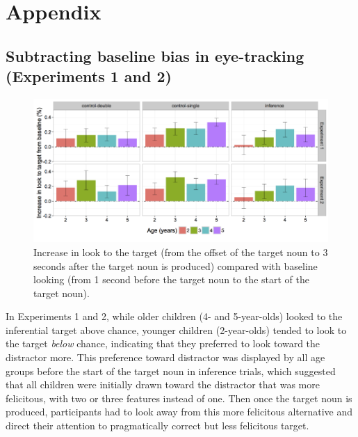 \documentclass[a4paper,man,apacite,floatsintext]{apa6}
\newenvironment{CodeChunk}{}{}
\begin{document}
\newpage

\section{Appendix}\label{appendix}

\subsection{Subtracting baseline bias in eye-tracking (Experiments 1 and
2)}\label{subtracting-baseline-bias-in-eye-tracking-experiments-1-and-2}

\begin{CodeChunk}
\begin{figure}[H]

{\centering \includegraphics{figs/et_diff-1} 

}

\caption[Increase in look to the target (from the offset of the target noun to 3 seconds after the target noun is produced) compared with baseline looking (from 1 second before the target noun to the start of the target noun)]{Increase in look to the target (from the offset of the target noun to 3 seconds after the target noun is produced) compared with baseline looking (from 1 second before the target noun to the start of the target noun).}\label{fig:et_diff}
\end{figure}
\end{CodeChunk}

In Experiments 1 and 2, while older children (4- and 5-year-olds) looked
to the inferential target above chance, younger children (2-year-olds)
tended to look to the target \emph{below} chance, indicating that they
preferred to look toward the distractor more. This preference toward
distractor was displayed by all age groups before the start of the
target noun in inference trials, which suggested that all children were
initially drawn toward the distractor that was more felicitous, with two
or three features instead of one. Then once the target noun is produced,
participants had to look away from this more felicitous alternative and
direct their attention to pragmatically correct but less felicitous
target.
\end{document}
